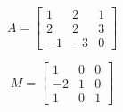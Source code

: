 \[
A=\left[
\begin{array}{ccc}
1 & 2 & 1 \\
2 & 2 & 3\\
-1 & -3 & 0
\end{array}\right]
\]
\bigskip

\[ 
M=\left[
\begin{array}{ccc}
  1 & 0 & 0 \\
 -2 & 1 & 0 \\
  1 & 0 & 1
\end{array}
\right]
\]
